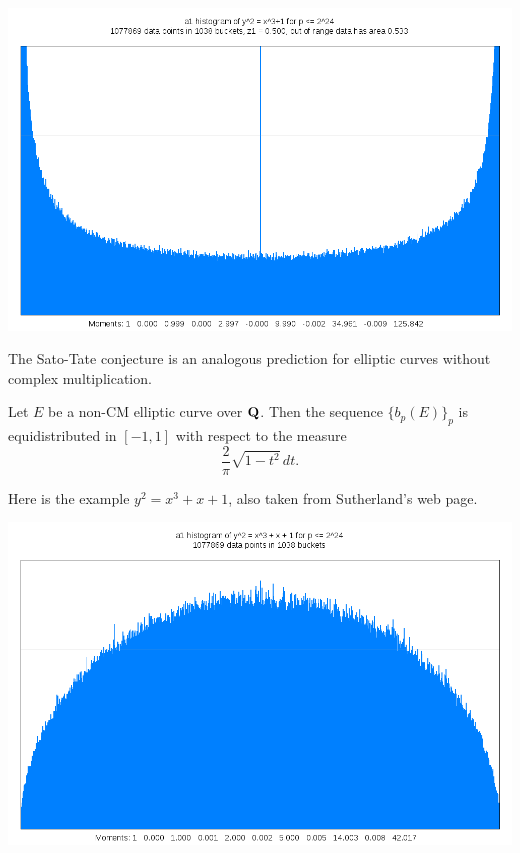 \begin{center}
  \includegraphics[scale=.2]{plots/Sato-Tate_CM.png}
\end{center}

The Sato-Tate conjecture is an analogous prediction for elliptic curves 
without complex multiplication. 

\begin{conjecture}
Let $E$ be a non-CM elliptic curve over $\mathbf{Q}$. Then the sequence 
$\{b_p(E)\}_p$ is equidistributed in $[-1,1]$ with respect to the 
measure 
\[
  \frac{2}{\pi} \sqrt{1-t^2}\, dt \text{.}
\]
\end{conjecture}

Here is the example $y^2=x^3+x+1$, also taken from Sutherland's web page. 

\begin{center}
  \includegraphics[scale=.2]{plots/Sato-Tate_nonCM.png}
\end{center}


